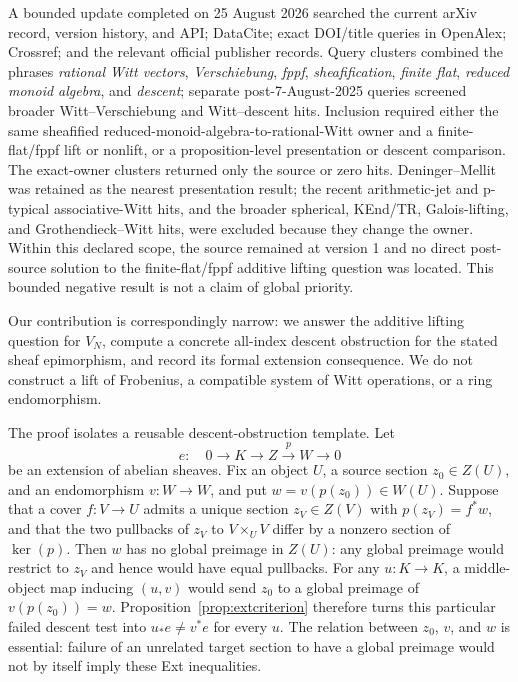 \documentclass[11pt]{article}
\theoremstyle{definition}
\begin{document}
A bounded update completed on 25 August 2026 searched the current arXiv
record, version history, and API; DataCite; exact DOI/title queries in
OpenAlex; Crossref; and the relevant official publisher records.  Query
clusters combined the phrases \emph{rational Witt vectors},
\emph{Verschiebung}, \emph{fppf}, \emph{sheafification},
\emph{finite flat}, \emph{reduced monoid algebra}, and \emph{descent};
separate post-7-August-2025 queries screened broader
Witt--Verschiebung and Witt--descent hits.  Inclusion required either the
same sheafified reduced-monoid-algebra-to-rational-Witt owner and a
finite-flat/fppf lift or nonlift, or a proposition-level presentation or
descent comparison.  The exact-owner clusters returned only the source or
zero hits.  Deninger--Mellit was retained as the nearest presentation
result; the recent arithmetic-jet and p-typical associative-Witt hits, and
the broader spherical, KEnd/TR, Galois-lifting, and
Grothendieck--Witt hits, were excluded because they change the owner.
Within this declared scope, the source remained at version 1 and no direct
post-source solution to the finite-flat/fppf additive lifting question was
located.  This bounded negative result is not a claim of global priority.

Our contribution is correspondingly narrow: we answer the additive lifting
question for \(V_N\), compute a concrete all-index descent obstruction for
the stated sheaf epimorphism, and record its formal extension consequence.
We do not construct a lift of Frobenius, a compatible system of Witt
operations, or a ring endomorphism.

The proof isolates a reusable descent-obstruction template.  Let
\[
 e:\quad 0\longrightarrow K\longrightarrow Z
 \xrightarrow{p}W\longrightarrow0
\]
be an extension of abelian sheaves.  Fix an object \(U\), a source section
\(z_0\in Z(U)\), and an endomorphism \(v\colon W\to W\), and put
\(w=v(p(z_0))\in W(U)\).  Suppose that a cover \(f\colon V\to U\)
admits a unique section \(z_V\in Z(V)\) with \(p(z_V)=f^*w\), and that
the two pullbacks of \(z_V\) to \(V\times_UV\) differ by a nonzero
section of \(\ker(p)\).  Then \(w\) has no global preimage in \(Z(U)\):
any global preimage would restrict to \(z_V\) and hence would have equal
pullbacks.  For any \(u\colon K\to K\), a middle-object map inducing
\((u,v)\) would send \(z_0\) to a global preimage of
\(v(p(z_0))=w\).  Proposition~\ref{prop:extcriterion} therefore turns
this particular failed descent test into \(u_*e\ne v^*e\) for every
\(u\).  The relation between \(z_0\), \(v\), and \(w\) is essential:
failure of an unrelated target section to have a global preimage would not
by itself imply these Ext inequalities.
\end{document}
